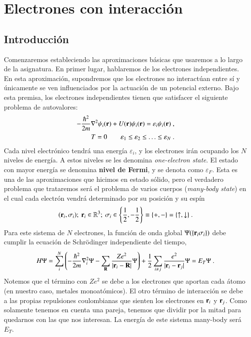 \chapter{Electrones con interacción}
\section{Introducción}
Comenzaremos estableciendo las aproximaciones básicas que usaremos a lo largo de la asignatura. En primer lugar, hablaremos de los electrones independientes. En esta aproximación, supondremos que los electrones no interactúan entre sí y únicamente se ven influenciados por la actuación de un potencial externo. Bajo esta premisa, los electrones independientes tienen que satisfacer el siguiente problema de autovalores:
\begin{align}\label{1.1}
-\frac{\hbar^2}{2m}\laplacian \psi_i (\B{r}) + U(\B{r}) \psi_i(\B{r}) = \varepsilon_i \psi_i(\B{r})\ ,\\
T = 0 \qquad \varepsilon_1\le \varepsilon_2 \le \ldots \le \varepsilon_N\ .
\end{align}
Cada nivel electrónico tendrá una energía $\varepsilon_i$, y los electrones irán ocupando los $N$ niveles de energía. A estos niveles se les denomina \emph{one-electron state}. El estado con mayor energía se denomina \textbf{nivel de Fermi}, y se denota como $\varepsilon_F$. Esta es una de las aproximaciones que hicimos en estado sólido, pero el verdadero problema que trataremos será el problema de varios cuerpos (\emph{many-body state}) en el cual cada electrón vendrá determinado por su posición y su espín
\begin{equation}
    (\B{r}_i,\sigma_i); \ \B{r}_i \in \K{R}^3;\ \sigma_i \in \left \{ \frac{1}{2},-\frac{1}{2} \right  \} \equiv \{ +,- \} = \{ \uparrow,\downarrow \} \ .
\end{equation}
Para este sistema de $N$ electrones, la función de onda global $\Psi(\{ \mathbf{r}_i \sigma_i  \})$ debe cumplir la ecuación de Schrödinger independiente del tiempo,
\begin{equation}
    H \Psi = \sum_i ^N \left ( -\frac{\hbar^2 }{2m}\laplacian_i \Psi - \sum_{\B{R}}\frac{Ze^2}{|\B{r}_i - \B{R}|} \Psi \right ) + \frac{1}{2} \sum_{i\neq j} \frac{e^2}{|\B{r}_i - \B{r}_j|} \Psi = E_T \Psi\ .
\end{equation}
Notemos que el término con $Ze^2$ se debe a los electrones que aportan cada átomo (en nuestro caso, metales monoatómicos). El otro término de interacción se debe a las propias repulsiones coulombianas que sienten los electrones en $\mathbf{r}_i$ y $\mathbf{r}_j$. Como solamente tenemos en cuenta una pareja, tenemos que dividir por la mitad para quedarnos con las que nos interesan. La energía de este sistema many-body será $E_T$. \\

